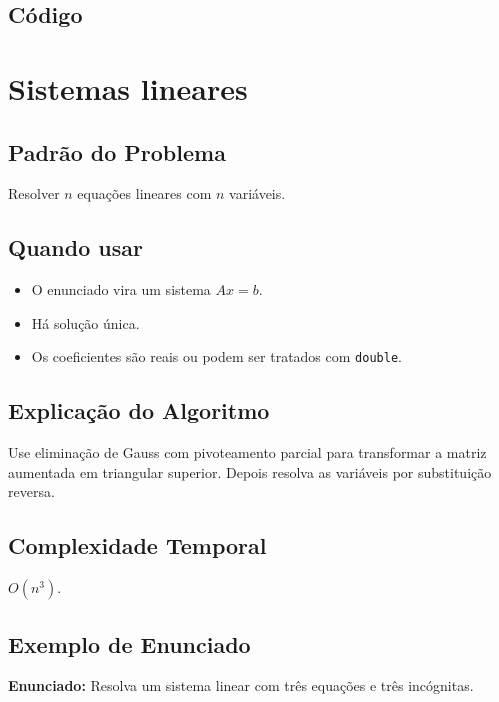 \subsection{Código}

\section{Sistemas lineares}

\subsection{Padrão do Problema}
Resolver $n$ equações lineares com $n$ variáveis.

\subsection{Quando usar}
\begin{itemize}[nosep]
  \item O enunciado vira um sistema $Ax=b$.
  \item Há solução única.
  \item Os coeficientes são reais ou podem ser tratados com \texttt{double}.
\end{itemize}

\subsection{Explicação do Algoritmo}
Use eliminação de Gauss com pivoteamento parcial para transformar a matriz aumentada em triangular superior. Depois resolva as variáveis por substituição reversa.

\subsection{Complexidade Temporal}
$O(n^3)$.

\subsection{Exemplo de Enunciado}
\begin{exemplodiabox}
\textbf{Enunciado:} Resolva um sistema linear com três equações e três incógnitas.
\end{exemplodiabox}

